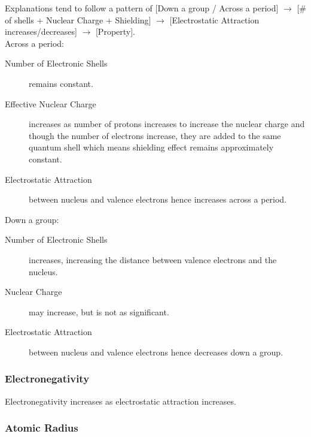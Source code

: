 \documentclass[../main]{subfiles}
\begin{document}

	Explanations tend to follow a pattern of [Down a group / Across a period] \(\rightarrow\) [\# of shells + Nuclear Charge + Shielding] \(\rightarrow\) [Electrostatic Attraction increases/decreases] \(\rightarrow\) [Property].\\

	Across a period:
	\begin{description}
		\item[Number of Electronic Shells] remains constant.
		\item[Effective Nuclear Charge] increases as number of protons increases to increase the nuclear charge and though the number of electrons increase, they are added to the same quantum shell which means shielding effect remains approximately constant.
		\item[Electrostatic Attraction] between nucleus and valence electrons hence increases across a period.
	\end{description}

	Down a group:
	\begin{description}
		\item[Number of Electronic Shells] increases, increasing the distance between valence electrons and the nucleus.
		\item[Nuclear Charge] may increase, but is not as significant.
		\item[Electrostatic Attraction] between nucleus and valence electrons hence decreases down a group.
	\end{description}

	\subsubsection{Electronegativity}


	Electronegativity increases as electrostatic attraction increases.

	\subsubsection{Atomic Radius}
\end{document}
